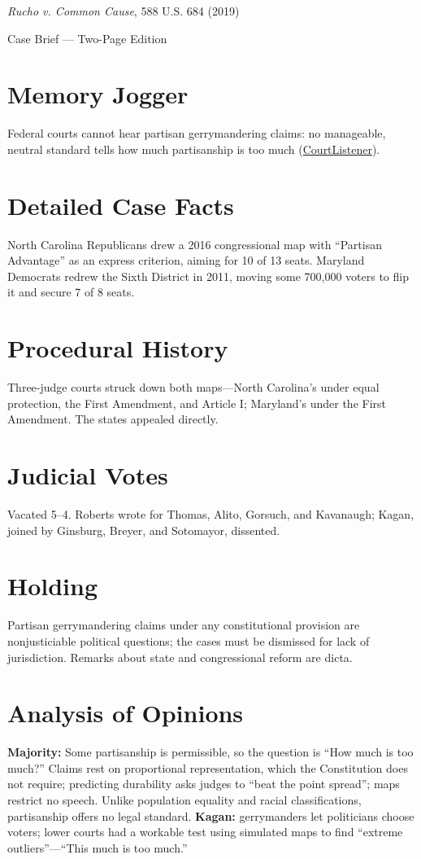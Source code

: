 \documentclass[12pt]{article}
\begin{document}
\begin{center}
{\LARGE \textit{Rucho v. Common Cause}, 588 U.S. 684 (2019)\par}
\vspace{0.5em}
{\large Case Brief --- Two-Page Edition\par}
\end{center}

\section{Memory Jogger}
Federal courts cannot hear partisan gerrymandering claims: no manageable, neutral standard tells how much partisanship is too much (\href{https://www.courtlistener.com/opinion/4633469/rucho-v-common-cause/}{CourtListener}).

\section{Detailed Case Facts}
North Carolina Republicans drew a 2016 congressional map with ``Partisan Advantage'' as an express criterion, aiming for 10 of 13 seats. Maryland Democrats redrew the Sixth District in 2011, moving some 700,000 voters to flip it and secure 7 of 8 seats.

\section{Procedural History}
Three-judge courts struck down both maps---North Carolina's under equal protection, the First Amendment, and Article I; Maryland's under the First Amendment. The states appealed directly.

\section{Judicial Votes}
Vacated 5--4. Roberts wrote for Thomas, Alito, Gorsuch, and Kavanaugh; Kagan, joined by Ginsburg, Breyer, and Sotomayor, dissented.

\section{Holding}
Partisan gerrymandering claims under any constitutional provision are nonjusticiable political questions; the cases must be dismissed for lack of jurisdiction. Remarks about state and congressional reform are dicta.

\section{Analysis of Opinions}
\textbf{Majority:} Some partisanship is permissible, so the question is ``How much is too much?'' Claims rest on proportional representation, which the Constitution does not require; predicting durability asks judges to ``beat the point spread''; maps restrict no speech. Unlike population equality and racial classifications, partisanship offers no legal standard. \textbf{Kagan:} gerrymanders let politicians choose voters; lower courts had a workable test using simulated maps to find ``extreme outliers''---``This much is too much.''
\end{document}
